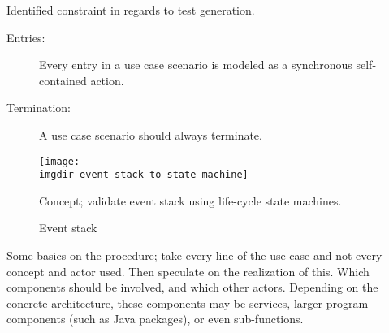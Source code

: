 Identified constraint in regards to test generation.
\begin{description}
  \item[Entries:] Every entry in a use case scenario is modeled as a synchronous self-contained action.
  \item[Termination:] A use case scenario should always terminate.
\end{description}





\begin{figure}[ht]
\centering
\texttt{[image: \\imgdir event-stack-to-state-machine]}
\caption{Concept; validate event stack using life-cycle state machines.}
\label{fig:event-stack-to-state-machine}
\end{figure}

\begin{figure}[ht]
\centering
\begin{drawstack}
\end{drawstack}
\caption{Event stack}
\label{fig:event-stack-example}
\end{figure}

Some basics on the procedure; take every line of the use case and not every concept and actor used. Then speculate on the realization of this. Which components should be involved, and which other actors. Depending on the concrete architecture, these components may be services, larger program components (such as Java packages), or even sub-functions.



